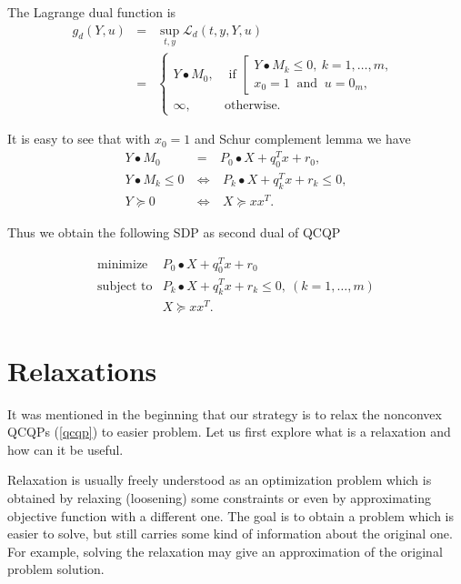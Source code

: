 \documentclass[12pt]{book}
\theoremstyle{definition}
\begin{document}
The Lagrange dual function is 
\begin{eqnarray}
g_d(Y,u) &=& \sup_{t,y} \mathcal{L}_d(t,y,Y,u) \\
&=&  \left\lbrace\begin{array}{ll}
Y\bullet M_0, & \mbox{ if } \left[\begin{array}{l} 
		 					 Y\bullet M_k \leq 0, \ k = 1,\dots ,m, \\
		 					 x_0 = 1 \ \mbox{ and } \
			 				 u = 0_m, 
			 				 \end{array}\right. \\
\infty, & \mbox{otherwise.} 
\end{array}\right. 
\end{eqnarray}

It is easy to see that with $x_0 = 1$ and Schur complement lemma we have
\begin{eqnarray}
Y\bullet M_0 &=& P_0\bullet X + q_0^Tx + r_0, \\
Y\bullet M_k \leq 0 \ &\Leftrightarrow& \ P_k\bullet X+ q_k^Tx + r_k \leq 0,\\
Y\succeq 0 \ &\Leftrightarrow& \ X\succeq xx^T.
\end{eqnarray}

Thus we obtain the following SDP as second dual of QCQP

\begin{equation}
\label{qcqpSecondDual} 
\begin{array}{ll}
\mbox{minimize}& P_0\bullet X + q_0^Tx + r_0\\
\mbox{subject to}& P_k\bullet X+ q_k^Tx + r_k \leq 0, \  (k = 1,\dots ,m)\\
& X\succeq xx^T.
\end{array} 
\end{equation}








\chapter{Relaxations}
\label{ChapterRelaxations}
It was mentioned in the beginning that our strategy is to relax the nonconvex QCQPs (\ref{qcqp}) to easier problem. Let us first explore what is a relaxation and how can it be useful. 

Relaxation is usually freely understood as an optimization problem which is obtained by relaxing (loosening) some constraints or even by approximating objective function with a different one. The goal is to obtain a problem which is easier to solve, but still carries some kind of information about the original one. For example, solving the relaxation may give an approximation of the original problem solution.
\end{document}
